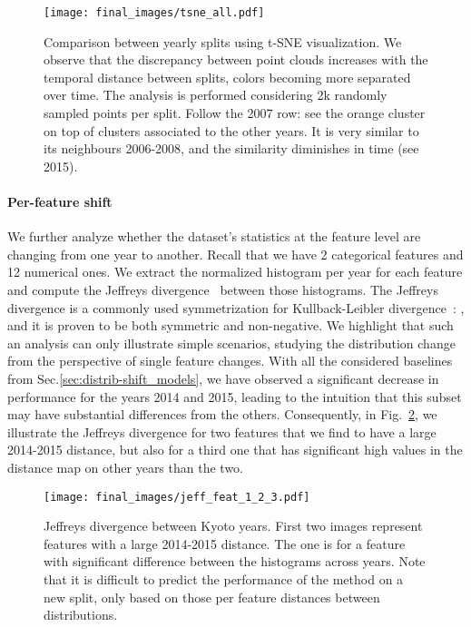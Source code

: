 \documentclass{article}
\begin{document}
\begin{figure}[t]
    \begin{center}
         \texttt{[image: final\_images/tsne\_all.pdf]}
    \end{center}
    \caption{Comparison between yearly splits using t-SNE visualization. We observe that the discrepancy between point clouds increases with the temporal distance between splits, colors becoming more separated over time. The analysis is performed considering 2k randomly sampled points per split. Follow the 2007 row: see the orange cluster on top of clusters associated to the other years. It is very similar to its neighbours 2006-2008, and the similarity diminishes in time (see 2015).}
    \label{fig:tsne_all}
\end{figure}
    


    \paragraph{Per-feature shift} We further analyze whether the dataset's statistics at the feature level are changing from one year to another. Recall that we have 2 categorical features and 12 numerical ones. We extract the normalized histogram per year for each feature and compute the Jeffreys divergence~\cite{jeff_divergence} between those histograms. The Jeffreys divergence is a commonly used symmetrization for Kullback-Leibler divergence~\cite{kl_divergence}: , and it is proven to be both symmetric and non-negative. We highlight that such an analysis can only illustrate simple scenarios, studying the distribution change from the perspective of single feature changes. With all the considered baselines from Sec.\ref{sec:distrib-shift_models}, we have observed a significant decrease in performance for the years 2014 and 2015, leading to the intuition that this subset may have substantial differences from the others. Consequently, in Fig.~\ref{fig:jeff_kyoto}, we illustrate the Jeffreys divergence for two features that we find to have a large 2014-2015 distance, but also for a third one that has significant high values in the distance map on other years than the two.
    \begin{figure}[t]
        \begin{center}
            \texttt{[image: final\_images/jeff\_feat\_1\_2\_3.pdf]}
        \end{center}
        \caption{Jeffreys divergence between Kyoto years. First two images represent features with a large 2014-2015 distance. The  one is for
        a feature with significant difference between the histograms across years. Note that it is difficult to predict the performance of the method on a new split, only based on those per feature distances between distributions.}
        \label{fig:jeff_kyoto}
    \end{figure}
    
\end{document}
